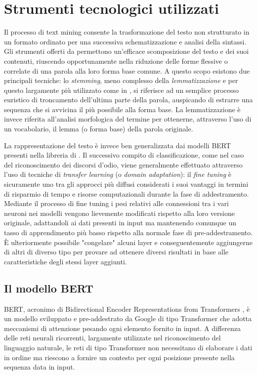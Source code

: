 \section{Strumenti tecnologici utilizzati}
Il processo di text mining consente la trasformazione del testo non strutturato in un formato ordinato per una successiva schematizzazione e analisi della sintassi. Gli strumenti offerti da \cite{Stanza} permettono un'efficace scomposizione del testo e dei suoi contenuti, riuscendo opportunamente nella riduzione delle forme flessive o correlate di una parola alla loro forma base comune. A questo scopo esistono due principali tecniche: lo \textit{stemming}, meno complesso della \textit{lemmatizzazione} e per questo largamente più utilizzato come in \cite{stem1,offensivelang,stem2}, si riferisce ad un semplice processo euristico di troncamento dell'ultima parte della parola, auspicando di estrarre una sequenza che si avvicina il più possibile alla forma base. La lemmatizzazione è invece riferita all'analisi morfologica del termine per ottenerne, attraverso l'uso di un vocabolario, il lemma (o forma base) della parola originale.

La rappresentazione del testo è invece ben generalizzata dai modelli BERT presenti nella libreria di \cite{huggingface}. Il successivo compito di classificazione, come nel caso del riconoscimento dei discorsi d'odio, viene generalmente effettuato attraverso l'uso di tecniche di \textit{transfer learning} (o \textit{domain adaptation}): il \textit{fine tuning} è sicuramente uno tra gli approcci più diffusi considerati i suoi vantaggi in termini di risparmio di tempo e
risorse computazionali durante la fase di addestramento. Mediante il processo di fine tuning i pesi relativi alle connessioni tra i vari neuroni nei modelli vengono lievemente modificati rispetto alla loro versione originale, adattandoli ai dati presenti in input ma mantenendo comunque un tasso di apprendimento più basso rispetto alla normale fase di pre-addestramento. È ulteriormente possibile "congelare" alcuni layer e conseguentemente aggiungerne di altri di diverso tipo per provare ad ottenere diversi risultati in base alle caratteristiche degli stessi layer aggiunti.




\subsection{Il modello BERT}
    BERT, acronimo di Bidirectional Encoder Representations from Transformers \cite{Bert}, è un modello sviluppato e pre-addestrato da Google di tipo Transformer che adotta meccanismi di attenzione pesando ogni elemento fornito in input. A differenza delle reti neurali ricorrenti, largamente utilizzate nel riconoscimento del linguaggio naturale, le reti di tipo Transformer non necessitano di elaborare i dati in ordine ma riescono a fornire un contesto per ogni posizione presente nella sequenza data in input.

